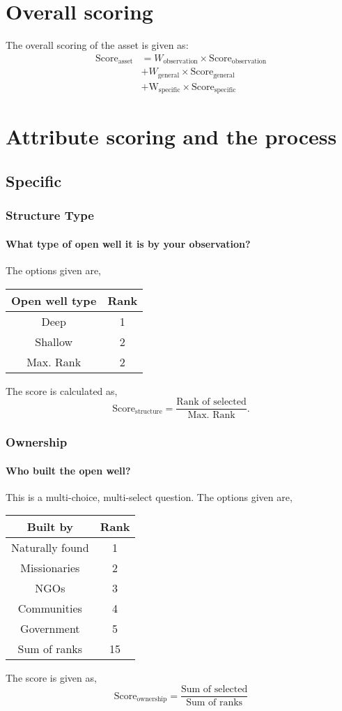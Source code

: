 \documentclass[oneside,twocolumn]{article}
\newcommand{\tsub}[2]{\text{#1}_{\text{#2}}}
\newcommand{\tsubb}[2]{#1_{\text{#2}}}
\newcommand{\dsub}[2]{\dfrac{\text{#1}}{\text{#2}}}
\newenvironment{ttable}
{
\begin{center}
\begin{tabular}{c|c}
\hline
}
{
\\ \hline
\end{tabular}
\end{center}
}
\begin{document}
\section{Overall scoring}
The overall scoring of the asset is given as:
\begin{align*}
	\tsub{Score}{asset} &= \tsubb{W}{observation} \times \tsub{Score}{observation} \\
	&+\tsubb{W}{general} \times \tsub{Score}{general} \\
	&+ \tsub{W}{specific} \times \tsub{Score}{specific}
\end{align*}
\section{Attribute scoring and the process}
\subsection{Specific}
\subsubsection{Structure Type}
\paragraph{What type of open well it is by your observation?}
The options given are,
\begin{ttable}
	Open well type & Rank \\ \hline
	Deep & 1 \\
	Shallow & 2 \\ \hline
	Max. Rank & 2
\end{ttable}
The score is calculated as,
\[
	\tsub{Score}{structure} = \dsub{Rank of selected}{Max. Rank}.
\]

\subsubsection{Ownership}
\paragraph{Who built the open well?}
This is a multi-choice, multi-select question. The options given are,
\begin{ttable}
	Built by & Rank \\ \hline
	Naturally found & 1 \\
	Missionaries & 2 \\
	NGOs & 3 \\
	Communities & 4 \\
	Government & 5 \\ \hline
	Sum of ranks & 15
\end{ttable}
The score is given as,
\[
	\tsub{Score}{ownership} = \dsub{Sum of selected}{Sum of ranks}
\]
\end{document}
